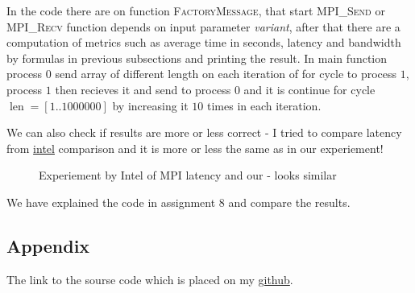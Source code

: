 \documentclass[%
12pt, %
final, %
oneside, %
onecolumn, %
centertags]{article} %
\theoremstyle{plain}
\theoremstyle{definition}
\theoremstyle{remark}
\begin{document}
In the code there are on function \textsc{FactoryMessage}, that start \textsc{MPI\_Send} or \textsc{MPI\_Recv} function depends on input parameter \textit{variant}, after that there are a computation of metrics such as average time in seconds, latency and bandwidth by formulas in previous subsections and printing the result. In main function process $0$ send array of different length on each iteration of for cycle to process $1$, process $1$ then recieves it and send to process $0$ and it is continue for cycle $\operatorname{len}=[1..1000000]$ by increasing it $10$ times in each iteration. 

We can also check if results are more or less correct - I tried to compare latency from \href{https:\//www.intel.com/content/www/us/en/high-performance-computing-fabrics/omni-path-architecture-performance-overview.html}{intel} comparison and it is more or less the same as in our experiement!

\begin{figure}[h!]
\centering
{} 

Experiement by Intel of MPI latency and our - looks similar
\end{figure}

We have explained the code in assignment 8 and compare the results.

\subsection{Appendix}

The link to the sourse code which is placed on my \href{https://github.com/aptmess/parallel_algorithms}{github}.
\end{document}
